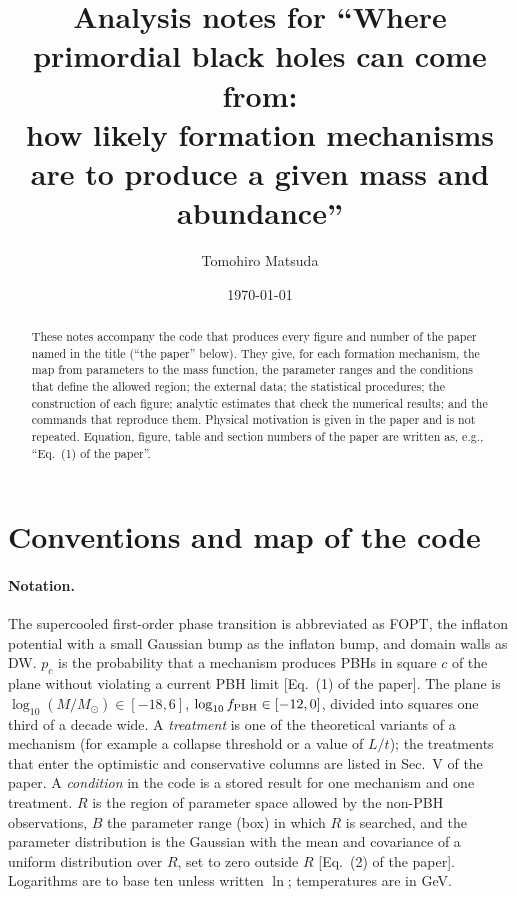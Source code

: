 \documentclass[aps,prd,onecolumn,superscriptaddress,nofootinbib,floatfix]{revtex4-2}
\newcommand{\fpbh}{f_{\rm PBH}}
\newcommand{\Msun}{M_\odot}
\begin{document}
\sloppy

\title{Analysis notes for ``Where primordial black holes can come from:\\ how likely formation mechanisms are to produce a given mass and abundance''}

\author{Tomohiro Matsuda}

\date{\today}

\begin{abstract}
These notes accompany the code that produces every figure and number of the paper named in the title (``the paper'' below). They give, for each formation mechanism, the map from parameters to the mass function, the parameter ranges and the conditions that define the allowed region; the external data; the statistical procedures; the construction of each figure; analytic estimates that check the numerical results; and the commands that reproduce them. Physical motivation is given in the paper and is not repeated. Equation, figure, table and section numbers of the paper are written as, e.g., ``Eq.~(1) of the paper''.
\end{abstract}

\maketitle

\section{Conventions and map of the code}\label{sec:conv}

\paragraph*{Notation.}
The supercooled first-order phase transition is abbreviated as FOPT, the inflaton potential with a small Gaussian bump as the inflaton bump, and domain walls as DW. $p_c$ is the probability that a mechanism produces PBHs in square $c$ of the plane without violating a current PBH limit [Eq.~(1) of the paper]. The plane is $\log_{10}(M/\Msun)\in[-18,6]$, $\log_{10}\fpbh\in[-12,0]$, divided into squares one third of a decade wide. A \emph{treatment} is one of the theoretical variants of a mechanism (for example a collapse threshold or a value of $L/t$); the treatments that enter the optimistic and conservative columns are listed in Sec.~V of the paper. A \emph{condition} in the code is a stored result for one mechanism and one treatment. $R$ is the region of parameter space allowed by the non-PBH observations, $B$ the parameter range (box) in which $R$ is searched, and the parameter distribution is the Gaussian with the mean and covariance of a uniform distribution over $R$, set to zero outside $R$ [Eq.~(2) of the paper]. Logarithms are to base ten unless written $\ln$; temperatures are in GeV.
\end{document}

